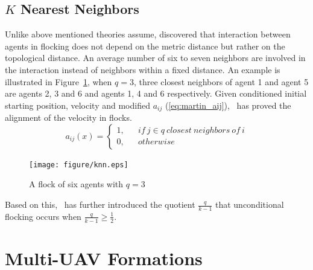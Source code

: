 \subsection{$K$ Nearest Neighbors}

Unlike above mentioned theories assume, \cite{PNAS} discovered that interaction between agents in flocking does not depend on the metric distance but rather on the topological distance. An average number of six to seven neighbors are involved in the interaction instead of neighbors within a fixed distance. An example is illustrated in Figure~\ref{fig:knn}, when $q=3$, three closest neighbors of agent 1 and agent 5 are agents 2, 3 and 6 and agents 1, 4 and 6 respectively. Given conditioned initial starting position, velocity and modified $a_{ij}$ (\ref{eq:martin_aij}),~\cite{Martin2014} has proved the alignment of the velocity in flocks.
\begin{equation}\label{eq:martin_aij}
a_{ij}(x)=\left\{\begin{array}{rcl}
1, & & {if\ j\in q\   closest\    neighbors\  of\ i}\\
0, & & {otherwise}
\end{array} \right.
\end{equation}

\begin{figure}[htb]
  \centering
  \texttt{[image: figure/knn.eps]}
  \caption{A flock of six agents with $q=3$}
  \label{fig:knn}
\end{figure}

\noindent
Based on this,~\cite{CuckerDong2016} has further introduced the quotient $\frac{q}{k-1}$ that unconditional flocking occurs when $\frac{q}{k-1}\geq\frac{1}{2}$.

\section{Multi-UAV Formations}

